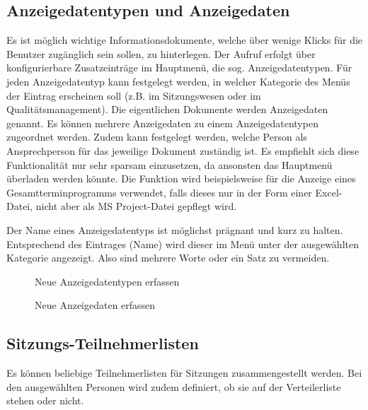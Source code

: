 \subsection{Anzeigedatentypen und Anzeigedaten}

Es ist möglich wichtige Informationsdokumente, welche über wenige Klicks für die Benutzer zugänglich sein sollen, zu hinterlegen. Der Aufruf erfolgt über konfigurierbare Zusatzeinträge im Hauptmenü, die sog. Anzeigedatentypen. Für jeden Anzeigedatentyp kann festgelegt werden, in welcher Kategorie des Menüs der Eintrag erscheinen soll (z.B. im Sitzungswesen oder im Qualitätsmanagement). Die eigentlichen Dokumente werden Anzeigedaten genannt. Es können mehrere Anzeigedaten zu einem Anzeigedatentypen zugeordnet werden. Zudem kann festgelegt werden, welche Person als Ansprechperson für das jeweilige Dokument zuständig ist. Es empfiehlt sich diese Funktionalität nur sehr sparsam einzusetzen, da ansonsten das Hauptmenü überladen werden könnte. Die Funktion wird beispielsweise für die Anzeige eines Gesamtterminprogramms verwendet, falls dieses nur in der Form einer Excel-Datei, nicht aber als MS Project-Datei gepflegt wird.

\vspace{\baselineskip}

Der Name eines Anzeigedatentyps ist möglichst prägnant und kurz zu halten. Entsprechend des Eintrages (Name) wird dieser im Menü unter der ausgewählten Kategorie angezeigt. Also sind mehrere Worte oder ein Satz zu vermeiden.

\begin{figure}[H]
\caption{Neue Anzeigedatentypen erfassen}
\end{figure}

\begin{figure}[H]
\caption{Neue Anzeigedaten erfassen}
\end{figure}


\clearpage
\subsection{Sitzungs-Teilnehmerlisten}

Es können beliebige Teilnehmerlisten für Sitzungen zusammengestellt werden. Bei den ausgewählten Personen wird zudem definiert, ob sie auf der Verteilerliste stehen oder nicht.

